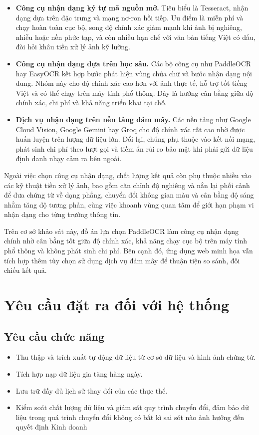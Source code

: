 \begin{itemize}
    \item \textbf{Công cụ nhận dạng ký tự mã nguồn mở.} Tiêu biểu là Tesseract, nhận dạng dựa trên đặc trưng và mạng nơ-ron hồi tiếp. Ưu điểm là miễn phí và chạy hoàn toàn cục bộ, song độ chính xác giảm mạnh khi ảnh bị nghiêng, nhiễu hoặc nền phức tạp, và còn nhiều hạn chế với văn bản tiếng Việt có dấu, đòi hỏi khâu tiền xử lý ảnh kỹ lưỡng.

    \item \textbf{Công cụ nhận dạng dựa trên học sâu.} Các bộ công cụ như PaddleOCR hay EasyOCR kết hợp bước phát hiện vùng chứa chữ và bước nhận dạng nội dung. Nhóm này cho độ chính xác cao hơn với ảnh thực tế, hỗ trợ tốt tiếng Việt và có thể chạy trên máy tính phổ thông. Đây là hướng cân bằng giữa độ chính xác, chi phí và khả năng triển khai tại chỗ.

    \item \textbf{Dịch vụ nhận dạng trên nền tảng đám mây.} Các nền tảng như Google Cloud Vision, Google Gemini hay Groq cho độ chính xác rất cao nhờ được huấn luyện trên lượng dữ liệu lớn. Đổi lại, chúng phụ thuộc vào kết nối mạng, phát sinh chi phí theo lượt gọi và tiềm ẩn rủi ro bảo mật khi phải gửi dữ liệu định danh nhạy cảm ra bên ngoài.
\end{itemize}

Ngoài việc chọn công cụ nhận dạng, chất lượng kết quả còn phụ thuộc nhiều vào các kỹ thuật tiền xử lý ảnh, bao gồm căn chỉnh độ nghiêng và nắn lại phối cảnh để đưa chứng từ về dạng phẳng, chuyển đổi không gian màu và cân bằng độ sáng nhằm tăng độ tương phản, cùng việc khoanh vùng quan tâm để giới hạn phạm vi nhận dạng cho từng trường thông tin.

Trên cơ sở khảo sát này, đồ án lựa chọn PaddleOCR làm công cụ nhận dạng chính nhờ cân bằng tốt giữa độ chính xác, khả năng chạy cục bộ trên máy tính phổ thông và không phát sinh chi phí. Bên cạnh đó, ứng dụng web minh họa vẫn tích hợp thêm tùy chọn sử dụng dịch vụ đám mây để thuận tiện so sánh, đối chiếu kết quả.






\section{Yêu cầu đặt ra đối với hệ thống}
\subsection{Yêu cầu chức năng}
\begin{itemize}
    \item Thu thập và trích xuất tự động dữ liệu từ cơ sở dữ liệu và hình ảnh chứng từ.
    \item Tích hợp nạp dữ liệu gia tăng hàng ngày.
    \item Lưu trữ đầy đủ lịch sử thay đổi của các thực thể.
    \item Kiểm soát chất lượng dữ liệu và giám sát quy trình chuyển đổi, đảm bảo dữ liệu trong quá trình chuyển đổi không có bất kì sai sót nào ảnh hưởng đến quyết định Kinh doanh
\end{itemize}

